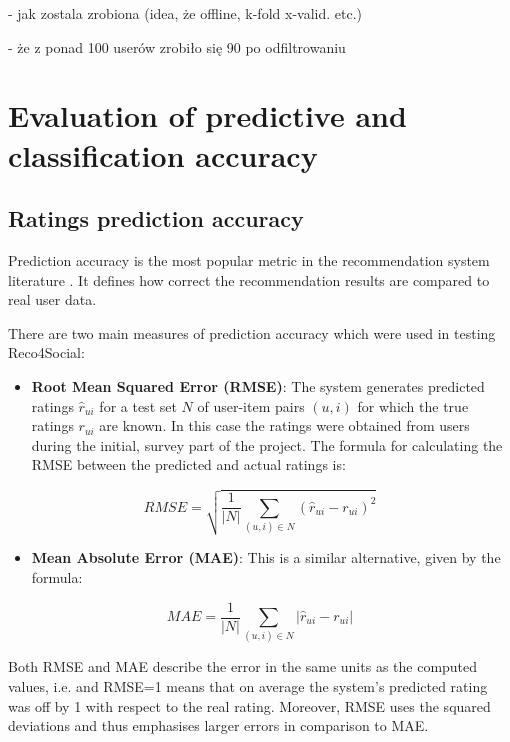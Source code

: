 \documentclass[12pt]{report}
\begin{document}
- jak zostala zrobiona (idea, że offline, k-fold x-valid. etc.)

- że z ponad 100 userów zrobiło się 90 po odfiltrowaniu

\section{Evaluation of predictive and classification accuracy}

\subsection{Ratings prediction accuracy}

Prediction accuracy is the most popular metric in the recommendation system literature \cite{eval_microsoft}. It defines how correct the recommendation results are compared to real user data. 

There are two main measures of prediction accuracy which were used in testing Reco4Social:
\begin{itemize}
\item {\bf Root Mean Squared Error (RMSE)}: The system generates predicted ratings $\hat{r}_{ui}$ for a test set $N$ of user-item pairs $(u,i)$ for which the true ratings $r_{ui}$ are known. In this case the ratings were obtained from users during the initial, survey part of the project. The formula for calculating the RMSE between the predicted and actual ratings is:
\end{itemize}

\begin{equation}
RMSE = \sqrt{\frac{1}{|N|} \displaystyle\sum_{(u,i) \in N} (\hat{r}_{ui} - r_{ui})^2 }
\label{eq.rmse}
\end{equation}
\hbox{}

\begin{itemize}
\item {\bf Mean Absolute Error (MAE)}: This is a similar alternative, given by the formula:
\end{itemize}

\begin{equation}
MAE = \frac{1}{|N|} \displaystyle\sum_{(u,i) \in N} |\hat{r}_{ui} - r_{ui}|
\label{eq.mae}
\end{equation}
\hbox{}

Both RMSE and MAE describe the error in the same units as the computed values, i.e. and RMSE=1 means that on average the system's predicted rating was off by 1 with respect to the real rating. Moreover, RMSE uses the squared deviations and thus emphasises larger errors in comparison to MAE.
\end{document}
